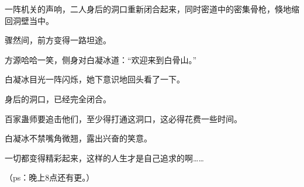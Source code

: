 \begin{this_body}
一阵机关的声响，二人身后的洞口重新闭合起来，同时密道中的密集骨枪，倏地缩回洞壁当中。

骤然间，前方变得一路坦途。

方源哈哈一笑，侧身对白凝冰道：“欢迎来到白骨山。”

白凝冰目光一阵闪烁，她下意识地回头看了一下。

身后的洞口，已经完全闭合。

百家蛊师要追击他们，至少得打通这洞口，这必得花费一些时间。

白凝冰不禁嘴角微翘，露出兴奋的笑意。

一切都变得精彩起来，这样的人生才是自己追求的啊……

（ps：晚上8点还有更。）

\end{this_body}

